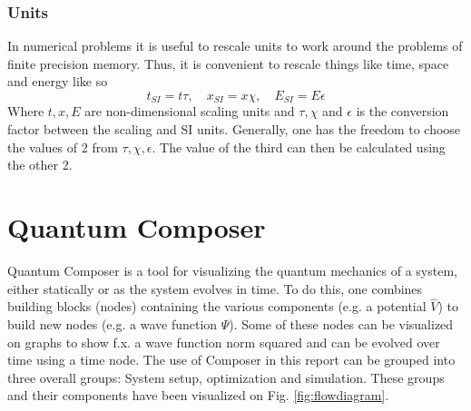 \documentclass[a4paper, twocolumn]{revtex4-1}
\begin{document}
\subsubsection{Units}

In numerical problems it is useful to rescale units to work around the problems of finite precision memory. Thus, it is convenient to rescale things like time, space and energy like so 
\begin{equation}
t_{SI} = t \tau, \quad  x_{SI} = x\chi, \quad  E_{SI} = E\epsilon
\end{equation}
Where $t,x,E$ are non-dimensional scaling units and $\tau, \chi$ and $\epsilon$ is the conversion factor between the scaling and SI units. Generally, one has the freedom to choose the values of 2 from $\tau, \chi, \epsilon$. The value of the third can then be calculated using the other 2. 




\section{Quantum Composer}\label{sec:Composer}
Quantum Composer is a tool for visualizing the quantum mechanics of a system, either statically or as the system evolves in time. To do this, one combines building blocks (nodes) containing the various components (e.g. a potential $\hat{V}$) to build new nodes (e.g. a wave function $\Psi$). Some of these nodes can be visualized on graphs to show f.x. a wave function norm squared and can be evolved over time using a time node. The use of Composer in this report can be grouped into three overall groups: System setup,  optimization and simulation. These groups and their components have been visualized on Fig. \ref{fig:flowdiagram}. 
\end{document}
